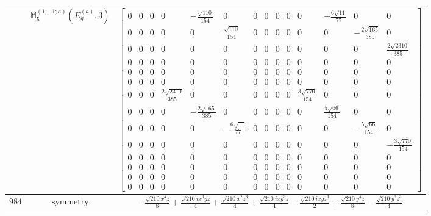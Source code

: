 \documentclass[fleqn,8pt,landscape]{jsarticle}
\begin{document}
\begin{longtable}{ccc}
$  $ & $ \mathbb{M}_{5}^{(1,-1;a)}(E_{g}^{(a)},3) $ & $ \begin{bmatrix} 0 & 0 & 0 & 0 & - \frac{\sqrt{110}}{154} & 0 & 0 & 0 & 0 & 0 & 0 & - \frac{6 \sqrt{11}}{77} & 0 & 0 \\ 0 & 0 & 0 & 0 & 0 & \frac{\sqrt{110}}{154} & 0 & 0 & 0 & 0 & 0 & 0 & - \frac{2 \sqrt{165}}{385} & 0 \\ 0 & 0 & 0 & 0 & 0 & 0 & 0 & 0 & 0 & 0 & 0 & 0 & 0 & \frac{2 \sqrt{2310}}{385} \\ 0 & 0 & 0 & 0 & 0 & 0 & 0 & 0 & 0 & 0 & 0 & 0 & 0 & 0 \\ 0 & 0 & 0 & 0 & 0 & 0 & 0 & 0 & 0 & 0 & 0 & 0 & 0 & 0 \\ 0 & 0 & 0 & 0 & 0 & 0 & 0 & 0 & 0 & 0 & 0 & 0 & 0 & 0 \\ 0 & 0 & 0 & \frac{2 \sqrt{2310}}{385} & 0 & 0 & 0 & 0 & 0 & 0 & \frac{3 \sqrt{770}}{154} & 0 & 0 & 0 \\ 0 & 0 & 0 & 0 & - \frac{2 \sqrt{165}}{385} & 0 & 0 & 0 & 0 & 0 & 0 & \frac{5 \sqrt{66}}{154} & 0 & 0 \\ 0 & 0 & 0 & 0 & 0 & - \frac{6 \sqrt{11}}{77} & 0 & 0 & 0 & 0 & 0 & 0 & - \frac{5 \sqrt{66}}{154} & 0 \\ 0 & 0 & 0 & 0 & 0 & 0 & 0 & 0 & 0 & 0 & 0 & 0 & 0 & - \frac{3 \sqrt{770}}{154} \\ 0 & 0 & 0 & 0 & 0 & 0 & 0 & 0 & 0 & 0 & 0 & 0 & 0 & 0 \\ 0 & 0 & 0 & 0 & 0 & 0 & 0 & 0 & 0 & 0 & 0 & 0 & 0 & 0 \\ 0 & 0 & 0 & 0 & 0 & 0 & 0 & 0 & 0 & 0 & 0 & 0 & 0 & 0 \\ 0 & 0 & 0 & 0 & 0 & 0 & 0 & 0 & 0 & 0 & 0 & 0 & 0 & 0 \end{bmatrix} $ \\ \hline
$ 984 $ & $ \text{symmetry} $ & $ - \frac{\sqrt{210} x^{4} z}{8} + \frac{\sqrt{210} i x^{3} y z}{4} + \frac{\sqrt{210} x^{2} z^{3}}{4} + \frac{\sqrt{210} i x y^{3} z}{4} - \frac{\sqrt{210} i x y z^{3}}{2} + \frac{\sqrt{210} y^{4} z}{8} - \frac{\sqrt{210} y^{2} z^{3}}{4} $ \\

\end{longtable}
\end{document}
